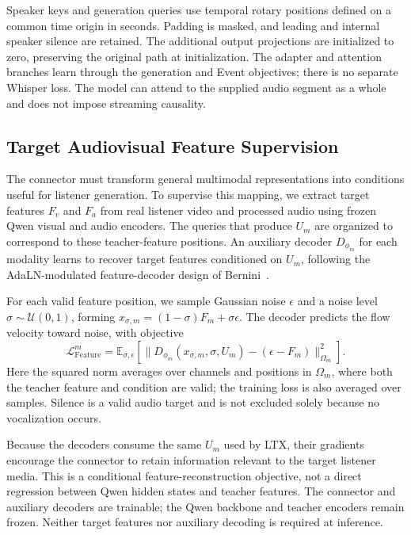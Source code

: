 Speaker keys and generation queries use temporal rotary positions
defined on a common time origin in seconds. Padding is masked, and
leading and internal speaker silence are retained. The additional output
projections are initialized to zero, preserving the original path at
initialization. The adapter and attention branches learn through the
generation and Event objectives; there is no separate Whisper loss.
The model can attend to the supplied audio segment as a whole and does
not impose streaming causality.

\subsection{Target Audiovisual Feature Supervision}
\label{sec:feature}
The connector must transform general multimodal representations into
conditions useful for listener generation. To supervise this mapping,
we extract target features $F_v$ and $F_a$ from real listener video and
processed audio using frozen Qwen visual and audio encoders. The queries
that produce $U_m$ are organized to correspond to these teacher-feature
positions. An auxiliary decoder $D_{\phi_m}$ for each modality learns
to recover target features conditioned on $U_m$, following the
AdaLN-modulated feature-decoder design of Bernini~\cite{bernini_pending}.

For each valid feature position, we sample Gaussian noise $\epsilon$
and a noise level $\sigma\sim\mathcal U(0,1)$, forming
$x_{\sigma,m}=(1-\sigma)F_m+\sigma\epsilon$. The decoder predicts
the flow velocity toward noise, with objective
\begin{equation}
 \mathcal L_{\mathrm{Feature}}^m =
 \mathbb E_{\sigma,\epsilon}\!\left[
 \big\|D_{\phi_m}(x_{\sigma,m},\sigma,U_m)
       -(\epsilon-F_m)\big\|_{\Omega_m}^{2}\right].
\label{eq:feature}
\end{equation}
Here the squared norm averages over channels and positions in
$\Omega_m$, where both the teacher feature and condition are valid;
the training loss is also averaged over samples. Silence is a valid
audio target and is not excluded solely because no vocalization occurs.

Because the decoders consume the same $U_m$ used by LTX, their gradients
encourage the connector to retain information relevant to the target
listener media. This is a conditional feature-reconstruction objective,
not a direct regression between Qwen hidden states and teacher features.
The connector and auxiliary decoders are trainable; the Qwen backbone
and teacher encoders remain frozen. Neither target features nor auxiliary
decoding is required at inference.

